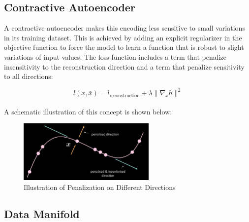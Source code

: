 \subsection{Contractive Autoencoder}

A contractive autoencoder makes this encoding less sensitive to small variations in its training dataset. This is achieved by adding an explicit regularizer in the objective function to force the model to learn a function that is robust to slight variations of input values. The loss function includes a term that penalize insensitivity to the reconstruction direction and a term that penalize sensitivity to all directions:

$$l(x,\bar{x}) = l_{\text{reconstruction}} + \lambda \| \nabla_x h \|^2$$
\\
A schematic illustration of this concept is shown below: 
\\
\begin{figure}[H]
    \centering
    \includegraphics[width=0.6\textwidth]{labs/10/images/Contractive_AutoEncoder.png}
    \caption{Illustration of Penalization on Different Directions}
    \label{fig:Contractive_AutoEncoder}
\end{figure}

\subsection{Data Manifold}

